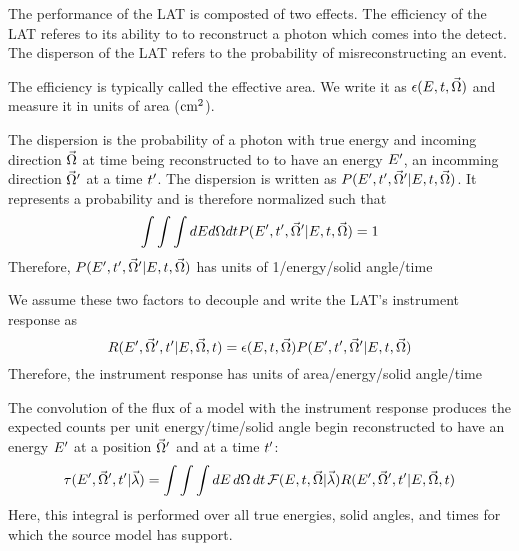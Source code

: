 

The performance of the LAT is composted of two effects.
The efficiency of the LAT referes to its ability to to
reconstruct a photon which comes into the detect.
The disperson of the LAT refers to the probability of
misreconstructing an event. 

The efficiency is typically called the effective area.
We write it as $\epsilon(E,t,\vec\Omega)$ 
and measure it in units of area ($\text{cm}^2$).



The dispersion is the probability of a photon with true energy \energy
and incoming direction $\vec\Omega$ at time \time being reconstructed to 
to have an energy $E'$, an incomming direction $\vec\Omega'$ at a time $t'$.
The dispersion is written as $P(E',t',\vec\Omega'|E,t,\vec\Omega)$.
It represents a probability and is therefore normalized such that
\begin{equation}
  \int \int \int dE d\Omega dt P(E',t',\vec\Omega'|E,t,\vec\Omega) = 1
\end{equation}
Therefore, $P(E',t',\vec\Omega'|E,t,\vec\Omega)$ 
has units of 1/energy/solid angle/time



We assume these two factors to decouple and write the LAT's instrument response as
\begin{equation}
  R(E',\vec\Omega',t'|E,\vec\Omega,t) = 
\epsilon(E,t,\vec\Omega) P(E',t',\vec\Omega'|E,t,\vec\Omega)
\end{equation}
Therefore, the instrument response has units of area/energy/solid angle/time

The convolution of the flux of a model with the instrument response 
produces the expected counts per unit energy/time/solid angle
begin reconstructed to have 
an energy $E'$ 
at a position $\vec\Omega'$ and at a time $t'$:
\begin{equation}
  \eqnlabel{eventrate}
  \eventrate(\energy',\solidangle',\time'|\modelparams)
  = \int \int \int \denergy \, \dsolidangle \, \dtime \,
  \fluxdensity(\energy,\time,\vec\Omega|\modelparams) \response(\energy',\solidangle',\time'|\energy,\solidangle,\time)
\end{equation}
Here, this integral is performed over all true energies, solid angles, and times
for which the source model has support.

